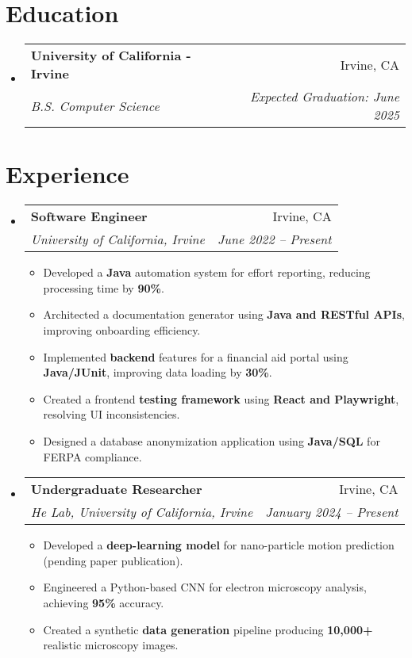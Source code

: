 \documentclass[letterpaper,11pt]{article}
\makeatletter
\newcommand{\resumeItem}[1]{
  \item\small{
    {#1 \vspace{-1pt}}
  }
}
\newcommand{\resumeSubheading}[4]{
  \vspace{-2pt}\item
    \begin{tabular*}{0.97\textwidth}[t]{l@{\extracolsep{\fill}}r}
      \textbf{#1} & #2 \\
      \textit{\small#3} & \textit{\small #4} \\
    \end{tabular*}\vspace{-5pt}
}
\newcommand{\resumeSubHeadingListStart}{\begin{itemize}[leftmargin=0.15in, label={}]}
\newcommand{\resumeSubHeadingListEnd}{\end{itemize}}
\newcommand{\resumeItemListStart}{\begin{itemize}}
\newcommand{\resumeItemListEnd}{\end{itemize}\vspace{-5pt}}
\makeatother
\begin{document}
\section{Education}
  \resumeSubHeadingListStart
    \resumeSubheading
      {University of California - Irvine}{Irvine, CA}
      {B.S. Computer Science}{Expected Graduation: June 2025}
  \resumeSubHeadingListEnd
  
\section{Experience}
  \resumeSubHeadingListStart
    \resumeSubheading
      {Software Engineer}{Irvine, CA}
      {University of California, Irvine}{June 2022 -- Present}
      \resumeItemListStart
        \resumeItem{Developed a \textbf{Java} automation system for effort reporting, reducing processing time by \textbf{90\%}.}
        \resumeItem{Architected a documentation generator using \textbf{Java and RESTful APIs}, improving onboarding efficiency.}
        \resumeItem{Implemented \textbf{backend} features for a financial aid portal using \textbf{Java/JUnit}, improving data loading by \textbf{30\%}.}
        \resumeItem{Created a frontend \textbf{testing framework} using \textbf{React and Playwright}, resolving UI inconsistencies.}
        \resumeItem{Designed a database anonymization application using \textbf{Java/SQL} for FERPA compliance.}
      \resumeItemListEnd
    \resumeSubheading
      {Undergraduate Researcher}{Irvine, CA}
      {He Lab, University of California, Irvine}{January 2024 -- Present}
      \resumeItemListStart
        \resumeItem{Developed a \textbf{deep-learning model} for nano-particle motion prediction (pending paper publication).}
        \resumeItem{Engineered a Python-based CNN for electron microscopy analysis, achieving \textbf{95\%} accuracy.}
        \resumeItem{Created a synthetic \textbf{data generation} pipeline producing \textbf{10,000+} realistic microscopy images.}
      \resumeItemListEnd
  \resumeSubHeadingListEnd
\end{document}
